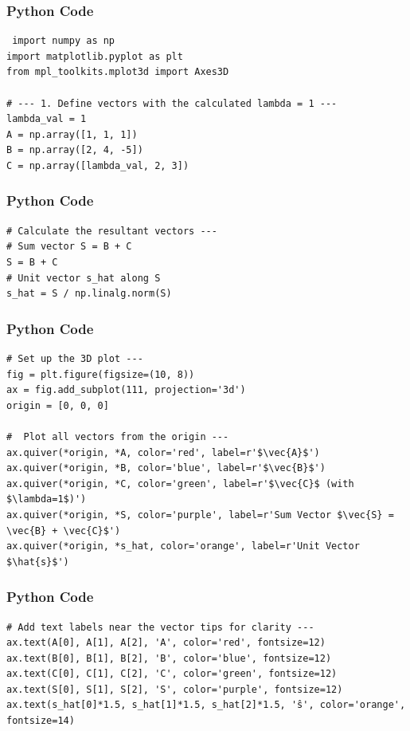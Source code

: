 \documentclass{beamer}
\begin{document}
\begin{frame}[fragile]
    \frametitle{Python Code}
    \begin{lstlisting}
 import numpy as np
import matplotlib.pyplot as plt
from mpl_toolkits.mplot3d import Axes3D

# --- 1. Define vectors with the calculated lambda = 1 ---
lambda_val = 1
A = np.array([1, 1, 1])
B = np.array([2, 4, -5])
C = np.array([lambda_val, 2, 3])
\end{lstlisting}
\end{frame}

\begin{frame}[fragile]
    \frametitle{Python Code}

    \begin{lstlisting}
# Calculate the resultant vectors ---
# Sum vector S = B + C
S = B + C
# Unit vector s_hat along S
s_hat = S / np.linalg.norm(S)
    \end{lstlisting}
\end{frame}

\begin{frame}[fragile]
    \frametitle{Python Code}

    \begin{lstlisting}
# Set up the 3D plot ---
fig = plt.figure(figsize=(10, 8))
ax = fig.add_subplot(111, projection='3d')
origin = [0, 0, 0]

#  Plot all vectors from the origin ---
ax.quiver(*origin, *A, color='red', label=r'$\vec{A}$')
ax.quiver(*origin, *B, color='blue', label=r'$\vec{B}$')
ax.quiver(*origin, *C, color='green', label=r'$\vec{C}$ (with $\lambda=1$)')
ax.quiver(*origin, *S, color='purple', label=r'Sum Vector $\vec{S} = \vec{B} + \vec{C}$')
ax.quiver(*origin, *s_hat, color='orange', label=r'Unit Vector $\hat{s}$')

    \end{lstlisting}
\end{frame}

\begin{frame}[fragile]
    \frametitle{Python Code}

    \begin{lstlisting}
# Add text labels near the vector tips for clarity ---
ax.text(A[0], A[1], A[2], 'A', color='red', fontsize=12)
ax.text(B[0], B[1], B[2], 'B', color='blue', fontsize=12)
ax.text(C[0], C[1], C[2], 'C', color='green', fontsize=12)
ax.text(S[0], S[1], S[2], 'S', color='purple', fontsize=12)
ax.text(s_hat[0]*1.5, s_hat[1]*1.5, s_hat[2]*1.5, 'ŝ', color='orange', fontsize=14)
\end{lstlisting}
\end{frame}
\end{document}
